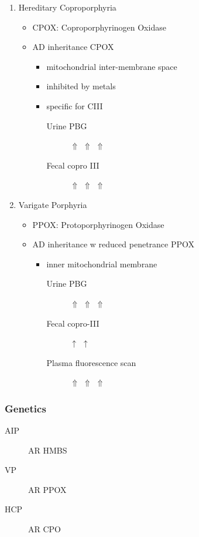 \documentclass[12pt]{scrartcl}
\begin{document}
\begin{enumerate}
\item Hereditary Coproporphyria
\label{sec:orgc38c1a7}
\begin{itemize}
\item CPOX: Coproporphyrinogen Oxidase
\item AD inheritance CPOX
\begin{itemize}
\item mitochondrial inter-membrane space
\item inhibited by metals
\item specific for CIII
\begin{description}
\item[{Urine PBG}] \(\Uparrow\) \(\Uparrow\) \(\Uparrow\)
\item[{Fecal copro III}] \(\Uparrow\) \(\Uparrow\) \(\Uparrow\)
\end{description}
\end{itemize}
\end{itemize}

\item Varigate Porphyria
\label{sec:org7f8cd78}
\begin{itemize}
\item PPOX: Protoporphyrinogen Oxidase
\item AD inheritance w reduced penetrance PPOX

\begin{itemize}
\item inner mitochondrial membrane
\begin{description}
\item[{Urine PBG}] \(\Uparrow\) \(\Uparrow\) \(\Uparrow\)
\item[{Fecal copro-III}] \(\uparrow\) \(\uparrow\)
\item[{Plasma fluorescence scan}] \(\Uparrow\) \(\Uparrow\) \(\Uparrow\)
\end{description}
\end{itemize}
\end{itemize}
\end{enumerate}

\subsubsection{Genetics}
\label{sec:org09edac7}
\begin{description}
\item[{AIP}] AR HMBS
\item[{VP}] AR PPOX
\item[{HCP}] AR CPO
\end{description}
\end{document}
